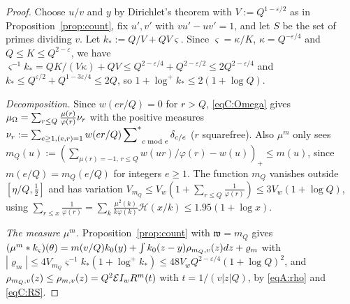 \begin{proof}
Choose $u/v$ and $y$ by Dirichlet's theorem with $V:=Q^{1-\varepsilon/2}$ as in Proposition~\ref{prop:count}, fix $u',v'$ with
$vu'-uv'=1$, and let $S$ be the set of primes dividing $v$. Let $k_*:=Q/V+QV\varsigma$. Since $\varsigma=\kappa/K$, $\kappa=Q^{-\varepsilon/4}$ and
$Q\le K\le Q^{2-\varepsilon}$, we have $\varsigma^{-1}k_*=QK/(V\kappa)+QV\le Q^{2-\varepsilon/4}+Q^{2-\varepsilon/2}\le2Q^{2-\varepsilon/4}$ and
$k_*\le Q^{\varepsilon/2}+Q^{1-3\varepsilon/4}\le2Q$, so $1+\log^+k_*\le2(1+\log Q)$.

\emph{Decomposition.} Since $w(er/Q)=0$ for $r>Q$, \eqref{eqC:Omega} gives $\mu_\Omega=\sum_{r\le Q}\frac{\mu(r)}{\varphi(r)}\nu_r$ with the positive
measures $\nu_r:=\sum_{e\ge1,(e,r)=1}w(er/Q)\sideset{}{^*}\sum_{c\bmod e}\delta_{c/e}$ ($r$ squarefree). Also $\mu^m$ only sees
$m_Q(u):=(\sum_{\mu(r)=-1,\,r\le Q}w(ur)/\varphi(r)-w(u))_+\le m(u)$, since $m(e/Q)=m_Q(e/Q)$ for integers $e\ge1$. The function $m_Q$ vanishes
outside $[\eta/Q,\frac12]$ and has variation $V_{m_Q}\le V_w(1+\sum_{r\le Q}\frac1{\varphi(r)})\le3V_w(1+\log Q)$, using
$\sum_{r\le x}\frac1{\varphi(r)}=\sum_k\frac{\mu^2(k)}{k\varphi(k)}\mathcal H(x/k)\le1.95(1+\log x)$.

\emph{The measure $\mu^m$.} Proposition~\ref{prop:count} with $\mathfrak w=m_Q$ gives
$(\mu^m*k_{\varsigma})(\theta)=m(v/Q)k_0(y)+\int k_0(z-y)\rho_{m_Q,v}(z)dz+\varrho_m$ with
$|\varrho_m|\le4V_{m_Q}\varsigma^{-1}k_*(1+\log^+k_*)\le48V_wQ^{2-\varepsilon/4}(1+\log Q)^2$, and
$\rho_{m_Q,v}(z)\le\rho_{m,v}(z)=Q^2\mathcal{E}I_w R^m(t)$ with $t=1/(v|z|Q)$, by \eqref{eqA:rho} and \eqref{eqC:RS}.


\end{proof}
